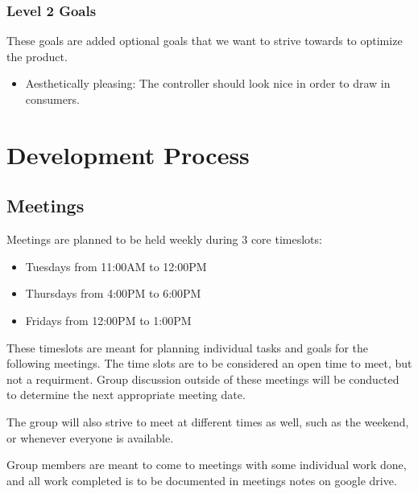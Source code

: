 \documentclass[a4]{article}
\begin{document}
\subsubsection{Level 2 Goals}
These goals are added optional goals that we want to strive towards to optimize the product.
\begin{itemize}
    \item \textcolor{McMasterMaroon}{Aesthetically pleasing}: The controller should look nice in order to draw in consumers.
\end{itemize}
\section{Development Process}
\subsection{Meetings}
Meetings are planned to be held weekly during 3 core timeslots:
\begin{itemize}
    \item Tuesdays from \textcolor{McMasterMaroon}{11:00AM to 12:00PM}
    \item Thursdays from \textcolor{McMasterMaroon}{4:00PM to 6:00PM}
    \item Fridays from \textcolor{McMasterMaroon}{12:00PM to 1:00PM}
\end{itemize}
These timeslots are meant for planning individual tasks and goals for the following meetings. The time slots are to be considered an open time to meet, but not a requirment. Group discussion outside of these meetings will be conducted to determine the next appropriate meeting date.

The group will also strive to meet at different times as well, such as the weekend, or whenever everyone is available.

Group members are meant to come to meetings with some individual work done, and all work completed is to be documented in meetings notes on google drive.
\end{document}
